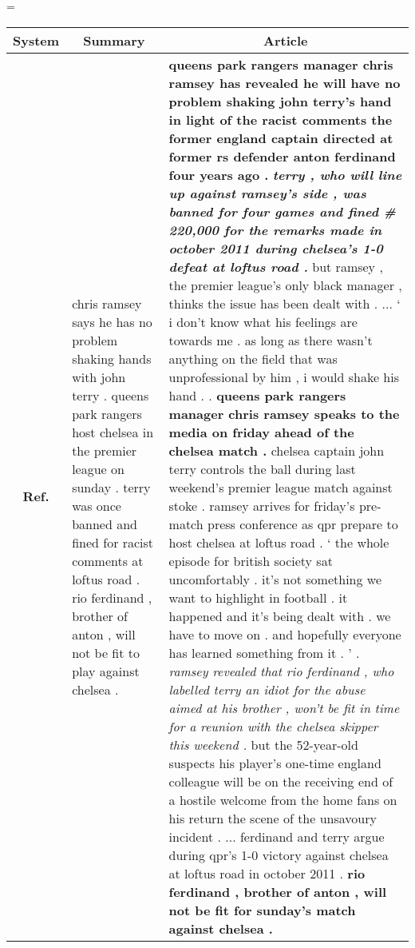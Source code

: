 \documentclass[11pt,a4paper]{article}
\begin{document}
\begin{table*}[t!]
    \scriptsize
    \centering
    \extrarowheight=\aboverulesep
    \addtolength{\extrarowheight}{\belowrulesep}
    \aboverulesep=1pt
    \belowrulesep=1pt
    \begin{tabular}{@{}c  p{} p{}}
     \toprule
\multicolumn{1}{c}{ \bf System} & \multicolumn{1}{c}{ \bf Summary} &  \multicolumn{1}{c}{ \bf Article} \\\midrule
\multicolumn{1}{c}{\bf Ref.} &  chris ramsey says he has no problem shaking hands with john terry . queens park rangers host chelsea in the premier league on sunday . terry was once banned and fined for racist comments at loftus road . rio ferdinand , brother of anton , will not be fit to play against chelsea . &  \multirow{3}{*}{\parbox[height=1.5\textwidth]{0.54\textwidth} {{\bf queens park rangers manager chris ramsey has revealed he will have no problem shaking john terry's hand in light of the racist comments the former england captain directed at former rs defender anton ferdinand four years ago .} {\bf \textit{terry , who will line up against ramsey's side , was banned for four games and fined \# 220,000 for the remarks made in october 2011 during chelsea's 1-0 defeat at loftus road .}} but ramsey , the premier league's only black manager , thinks the issue has been dealt with . ... ` i don't know what his feelings are towards me . as long as there wasn't anything on the field that was unprofessional by him , i would shake his hand . . {\bf queens park rangers manager chris ramsey speaks to the media on friday ahead of the chelsea match .} chelsea captain john terry controls the ball during last weekend's premier league match against stoke . ramsey arrives for friday's pre-match press conference as qpr prepare to host chelsea at loftus road . ` the whole episode for british society sat uncomfortably . it's not something we want to highlight in football . it happened and it's being dealt with . we have to move on . and hopefully everyone has learned something from it . ' . \textit{ramsey revealed that rio ferdinand , who labelled terry an idiot for the abuse aimed at his brother , won't be fit in time for a reunion with the chelsea skipper this weekend .} but the 52-year-old suspects his player's one-time england colleague will be on the receiving end of a hostile welcome from the home fans on his return the scene of the unsavoury incident . ... ferdinand and terry argue during qpr's 1-0 victory against chelsea at loftus road in october 2011 . {\bf rio ferdinand , brother of anton , will not be fit for sunday's match against chelsea .}}}

\end{tabular}
\end{table*}
\end{document}
